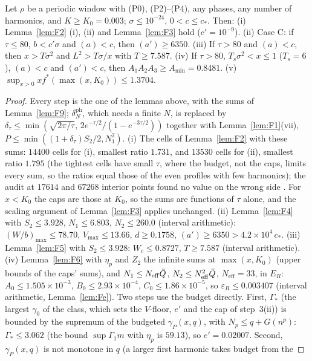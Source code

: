 \begin{lemma} 
\label{lem:F10}
Let $\rho$ be a periodic window with (P0), (P2)--(P4), any phases, any number of harmonics, and $K\ge K_0=0.003$; $\sigma\le10^{-24}$, $0<c\le c_*$. Then:
(i) Lemma~\ref{lem:F2} (i), (ii) and Lemma~\ref{lem:F3} hold ($c'=10^{-9}$).
(ii) Case C: if $\tau\le80$, $b<c'\sigma$ and $(a)<c$, then $(a')\ge6350$.
(iii) If $\tau>80$ and $(a)<c$, then $x>T\sigma^2$ and $L^2>T\sigma/x$ with $T\ge7.587$.
(iv) If $\tau>80$, $T_s\sigma^2<x\le1$ ($T_s=6$), $(a)<c$ and $(a')<c$, then $A_1A_2A_3\ge A_{\min}=0.8481$.
(v) $\sup_{x>0}xf^*(\max(x,K_0))\le1.3704$.
\end{lemma}
\begin{proof}
Every step is the one of the lemmas above, with the sums of Lemma~\ref{lem:F9}; $\delta_N^{\mathrm{ph}}$, which needs a finite $N$, is replaced by
$\delta_\tau\le\min(\sqrt{2\pi/\tau},\,2e^{-\tau/2}/(1-e^{-3\tau/2}))$ together with Lemma~\ref{lem:F1}(vii), $P\le\min((1+\delta_\tau)S_2/2,N_1^2)$.
(i) The cells of Lemma~\ref{lem:F2} with these sums: $14400$ cells for (i), smallest ratio $1.731$, and $13530$ cells for (ii), smallest ratio $1.795$ (the
tightest cells have small $\tau$, where the budget, not the caps, limits every sum, so the ratios equal those of the even profiles with few harmonics);
the audit at $17614$ and $67268$ interior points found no value on the wrong side \numst. For $x<K_0$ the caps are those at $K_0$, so the sums are
functions of $\tau$ alone, and the scaling argument of Lemma~\ref{lem:F3} applies unchanged.
(ii) Lemma~\ref{lem:F4} with $S_2\le3.928$, $N_1\le6.803$, $N_2\le260.0$ (interval arithmetic): $(W/b)_{\max}\le78.70$, $V_{\max}\le13.66$, $d\ge0.1758$,
$(a')\ge6350>4.2\times10^{4}\,c_*$.
(iii) Lemma~\ref{lem:F5} with $S_2\le3.928$: $W_c\le0.8727$, $T\ge7.587$ (interval arithmetic).
(iv) Lemma~\ref{lem:F6} with $\eta_p$ and $Z_2$ the infinite sums at $\max(x,K_0)$ (upper bounds of the caps' sums), and $N_1\le N_{\mathrm{eff}}\bar Q$,
$N_2\le N_{\mathrm{eff}}^2\bar Q$, $N_{\mathrm{eff}}=33$, in $E_R$: $A_0\le1.505\times10^{-3}$, $B_0\le2.93\times10^{-4}$, $C_0\le1.86\times10^{-5}$, so $\varepsilon_R\le0.003407$
(interval arithmetic, Lemma~\ref{lem:Fe}). Two steps use the budget directly. First, $\Gamma_*$ (the largest $\gamma_0$ of the class, which sets the
$V$-floor, $e'$ and the cap of step~3(ii)) is bounded by the supremum of the budgeted $\gamma_P(x,q)$, with $N_p\le q+G(n^p)$: $\Gamma_*\le3.062$
(the bound $\sup\Gamma_1m$ with $\eta_p$ is $59.13$), so $e'=0.02007$. Second, $\gamma_P(x,q)$ is not monotone in $q$ (a larger first harmonic takes budget from the

\end{proof}
